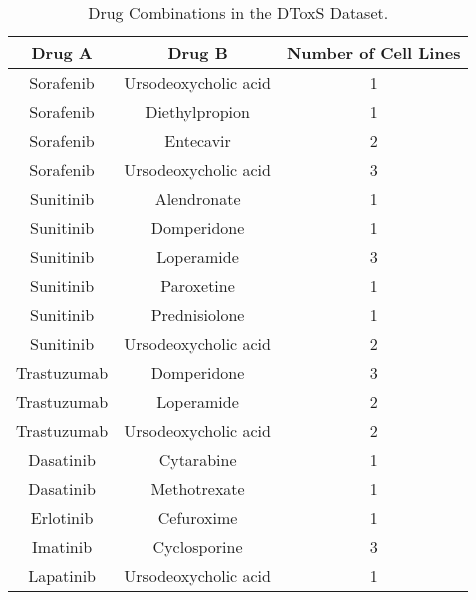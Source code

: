 \documentclass[]{article}
\begin{document}
\begin{table*}
	\centering
	\caption{Drug Combinations in the DToxS Dataset.}
		\label{drugCombo}
\begin{tabular}{| c | c | c |}
	\hline
	Drug A & Drug B & Number of Cell Lines \\
	\hline
	Sorafenib & Ursodeoxycholic acid & 1 \\
	Sorafenib & Diethylpropion & 1\\
	Sorafenib & Entecavir & 2\\
	Sorafenib & Ursodeoxycholic acid & 3\\
	Sunitinib & Alendronate & 1 \\
	Sunitinib & Domperidone & 1\\
	Sunitinib & Loperamide & 3\\
	Sunitinib & Paroxetine & 1\\
	Sunitinib & Prednisiolone & 1\\
	Sunitinib & Ursodeoxycholic acid & 2\\
	Trastuzumab & Domperidone & 3\\
	Trastuzumab & Loperamide & 2\\
	Trastuzumab & Ursodeoxycholic acid & 2\\
	Dasatinib & Cytarabine & 1\\
	Dasatinib & Methotrexate & 1\\
	Erlotinib & Cefuroxime & 1\\
	Imatinib & Cyclosporine & 3 \\
	Lapatinib & Ursodeoxycholic acid & 1 \\
	\hline
\end{tabular}
\end{table*}



\end{document}
